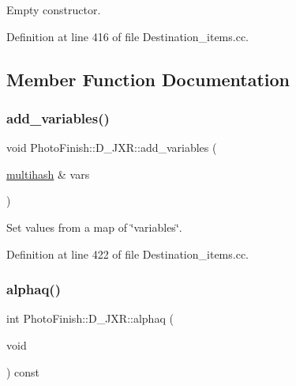 Empty constructor. 



Definition at line 416 of file Destination\+\_\+items.\+cc.



\subsection{Member Function Documentation}
\mbox{\label{class_photo_finish_1_1_d___j_x_r_a129b83b661aa0af9e859805d5068ee8b}} 
\subsubsection{\texorpdfstring{add\+\_\+variables()}{add\_variables()}}
{\footnotesize\ttfamily void Photo\+Finish\+::\+D\+\_\+\+J\+X\+R\+::add\+\_\+variables (\begin{DoxyParamCaption}\item[{\hyperlink{namespace_photo_finish_a6f41796f162687538b7da5c7a95e2d18}{multihash} \&}]{vars }\end{DoxyParamCaption})}



Set values from a map of \char`\"{}variables\char`\"{}. 



Definition at line 422 of file Destination\+\_\+items.\+cc.

\mbox{\label{class_photo_finish_1_1_d___j_x_r_a97e0436d0755f5450c500ad480440972}} 
\subsubsection{\texorpdfstring{alphaq()}{alphaq()}}
{\footnotesize\ttfamily int Photo\+Finish\+::\+D\+\_\+\+J\+X\+R\+::alphaq (\begin{DoxyParamCaption}\item[{void}]{ }\end{DoxyParamCaption}) const\hspace{0.3cm}{\ttfamily [inline]}}



